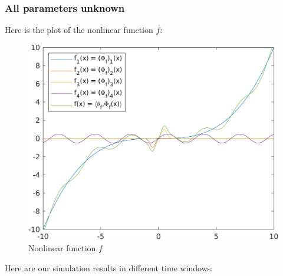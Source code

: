 \documentclass[12pt,a4paper]{article}
\begin{document}
	\subsubsection*{All parameters unknown}
	Here is the plot of the nonlinear function $f$:
	\begin{figure}[H]
		\centering
		\includegraphics[scale=1.0]{Graphics/Function.png}
		\caption{Nonlinear function $f$}
	\end{figure}

	Here are our simulation results in different time windows:
	
\end{document}
